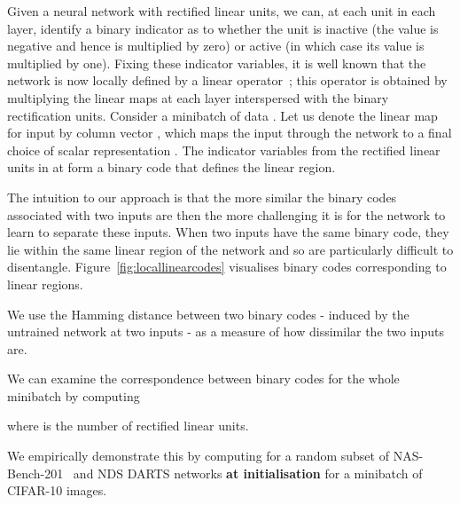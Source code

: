 \documentclass{article}
\begin{document}
Given a neural network with rectified linear units, we can, at each unit in each layer, identify a binary indicator as to whether the unit is inactive (the value is negative and hence is multiplied by zero) or active (in which case its value is multiplied by one). Fixing these indicator variables, it is well known that the network is now locally defined by a linear operator~\citep{hanin2019deep}; this operator is obtained by multiplying the linear maps at each layer interspersed with the binary rectification units. Consider a minibatch of data . Let us denote the linear map for input  by column vector , which maps the input through the network  to a final choice of scalar representation . The indicator variables from the rectified linear units in  at  form a binary code  that defines the linear region.

The intuition to our approach is that the more similar the binary codes associated with two inputs are then the more challenging it is for the network to learn to separate these inputs. When two inputs have the same binary code, they lie within the same linear region of the network and so are particularly difficult to disentangle. Figure~\ref{fig:locallinearcodes} visualises binary codes corresponding to linear regions. 

We use the Hamming distance  between two binary codes - induced by the untrained network at two inputs - as a measure of how dissimilar the two inputs are. 


We can examine the correspondence between binary codes for the whole minibatch by computing


where  is the number of rectified linear units. 



We empirically demonstrate this by computing  for a random subset of NAS-Bench-201~\citep{Dong2020NAS-Bench-201}  and NDS DARTS \citep{radosavovic2019network} networks {\bf at initialisation} for a minibatch of CIFAR-10 images.
\end{document}
